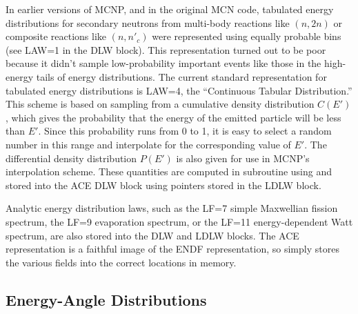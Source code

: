 In earlier versions of MCNP, and in the original MCN code, tabulated
energy distributions for secondary neutrons from multi-body reactions
like $(n,2n)$ or composite reactions like $(n,n'_c)$ were represented
using equally probable bins (see LAW=1
in the DLW block).  This representation turned out to be poor because
it didn't sample low-probability important events like those in the
high-energy tails of energy distributions.  The current standard
representation for tabulated energy distributions is LAW=4, the
``Continuous Tabular Distribution.''  This scheme is based on sampling
from a cumulative density distribution $C(E')$, which gives the probability that the energy of
the emitted particle will be less than $E'$.  Since this probability
runs from 0 to 1, it is easy to select a random number in this range and
interpolate for the corresponding value of $E'$.  The differential
density distribution $P(E')$ is also given for use in MCNP's
interpolation scheme.  These quantities are computed in subroutine
 using
 and stored into the ACE DLW
block using pointers stored in the LDLW block.

Analytic energy distribution laws, such as the LF=7 simple Maxwellian
fission spectrum, the LF=9 evaporation spectrum, or the LF=11
energy-dependent Watt spectrum, are also stored into the DLW and LDLW
blocks.  The ACE representation is a faithful image of the ENDF
representation, so  simply stores the various fields
into the correct locations in memory.

\subsection{Energy-Angle Distributions}
\label{ssACER_EAdist}

